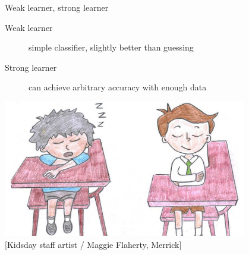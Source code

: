 \documentclass[handout]{beamer}
\newcommand{\hreftextsize}{\footnotesize}
\begin{document}
\begin{frame}{Weak learner, strong learner}
\begin{description}
	\item[Weak learner] simple classifier, slightly better than guessing
	\item[Strong learner] can achieve arbitrary accuracy with enough data
\end{description}
\begin{center}
	\includegraphics[width=0.8\textwidth]{figs/good_bad_student}
	\\
	{\hreftextsize[Kidsday staff artist / Maggie Flaherty, Merrick]}
\end{center}
\end{frame}
\end{document}
